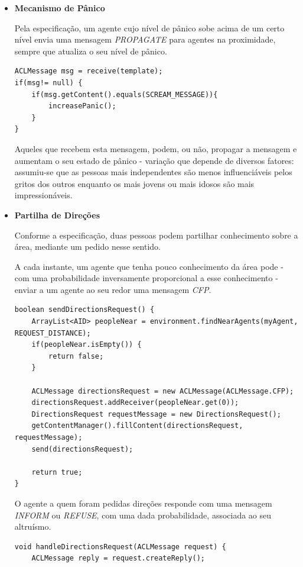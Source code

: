 \documentclass[12pt]{article}
\begin{document}
\begin{titlepage}
\begin{itemize}
\item \textbf{Mecanismo de Pânico}

Pela especificação, um agente cujo nível de pânico sobe acima de um certo nível envia uma mensagem \textit{PROPAGATE} para agentes na proximidade, sempre que atualiza o seu nível de pânico.

\begin{lstlisting}[caption= Código \textit{Java}\ responsável pelo envio de um grito.]
ACLMessage msg = receive(template);
if(msg!= null) {
	if(msg.getContent().equals(SCREAM_MESSAGE)){
		increasePanic();
	}
}
\end{lstlisting}

Aqueles que recebem esta mensagem, podem, ou não, propagar a mensagem e aumentam o seu estado de pânico - variação que depende de diversos fatores: assumiu-se que as pessoas mais independentes são menos influenciáveis pelos gritos dos outros enquanto os mais jovens ou mais idosos são mais impressionáveis.\newline


\item \textbf{Partilha de Direções}

Conforme a especificação, duas pessoas podem partilhar conhecimento sobre a área, mediante um pedido nesse sentido. 

A cada instante, um agente que tenha pouco conhecimento da área pode - com uma probabilidade inversamente proporcional a esse conhecimento - enviar a um agente ao seu redor uma mensagem \textit{CFP}.

\begin{lstlisting}[caption= Código \textit{Java}\ da função responsável pelo envio de um pedido de direções.]
boolean sendDirectionsRequest() {
	ArrayList<AID> peopleNear = environment.findNearAgents(myAgent, REQUEST_DISTANCE);
	if(peopleNear.isEmpty()) {
		return false;
	}
	
	ACLMessage directionsRequest = new ACLMessage(ACLMessage.CFP);			
	directionsRequest.addReceiver(peopleNear.get(0));
	DirectionsRequest requestMessage = new DirectionsRequest();
	getContentManager().fillContent(directionsRequest, requestMessage);
	send(directionsRequest);
	
	return true;
}
\end{lstlisting}

O agente a quem foram pedidas direções responde com uma mensagem \textit{INFORM} ou \textit{REFUSE}, com uma dada probabilidade, associada ao seu altruísmo.

\begin{lstlisting}[caption= Código \textit{Java}\ da função responsável pela receção de pedidos de direções.]
void handleDirectionsRequest(ACLMessage request) {
	ACLMessage reply = request.createReply();
	

\end{lstlisting}
\end{itemize}
\end{titlepage}
\end{document}
